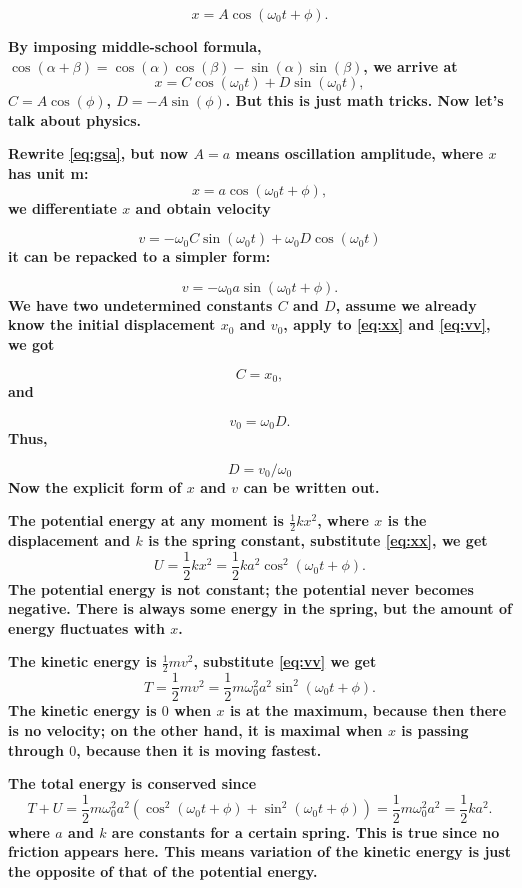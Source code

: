 \documentclass[]{revtex4}
\newcommand{\st}[1]{{\color{red}\bfseries #1}}
\begin{document}
\[x = A\cos(\omega_0t + \phi). \label{eq:gsa}\]

\st{
By imposing middle-school formula, $\cos (\alpha + \beta) = \cos(\alpha) \cos(\beta) - \sin(\alpha) \sin(\beta)$,
we arrive at
}
\[x = C\cos(\omega_0t)+ D\sin(\omega_0 t),\]
\st{
$C = A \cos(\phi)$, $D = -A \sin(\phi)$. But this is just math tricks.
Now let's talk about physics.
}

\st{
Rewrite \eqref{eq:gsa}, but now $A = a$ means oscillation amplitude, where $x$ has unit \si{\meter}:
}
\[x = a \cos(\omega_0t + \phi), \label{eq:xx}\]
\st{
we differentiate $x$ and obtain velocity
}

\[v = -\omega_0 C\sin(\omega_0t)+\omega_0 D\cos(\omega_0t)\]
\st{
it can be repacked to a simpler form:
}

\[v=-\omega_0 a \sin(\omega_0t+\phi). \label{eq:vv}\]
\st{
We have two undetermined constants $C$ and $D$, assume we already know
the initial displacement $x_0$ and $v_0$, apply to \eqref{eq:xx} and \eqref{eq:vv},
we got
}

\[C = x_0,\]
\st{
and
}

\[v_0 = \omega_0 D.\]
\st{
Thus,
}

\[D= v_0/\omega_0 \]
\st{
Now the explicit form of $x$ and $v$ can be written out.
}

\st{
The potential energy at any moment is $\frac{ 1 }{ 2 } k x^2$, where $x$ is the displacement and $k$ is the spring constant, substitute \eqref{eq:xx}, we get
}
\[U = \frac{1}{2}kx^2 = \frac{1}{2}ka^2\cos^2(\omega_0t+\phi). \label{eq:uu}\]
\st{
The potential energy is not constant; the potential never becomes negative. There is always some energy in the spring, but the amount of energy fluctuates with $x$. 
}

\st{
The kinetic energy is $\frac{ 1 }{ 2 } m v^2$, substitute \eqref{eq:vv} we get
}
\[T = \frac{1}{2}mv^2 = \frac{1}{2}m\omega_0^2a^2\sin^2(\omega_0t+\phi).\]
\st{
The kinetic energy is $0$ when $x$ is at the maximum, because then there is no velocity; on the other hand, it is maximal when $x$ is passing through $0$, because then it is moving fastest.
}

\st{
The total energy is conserved since
}
\[T+U = \frac{1}{2}m\omega_0^2a^2(\cos^2(\omega_0t+\phi)+\sin^2(\omega_0t+\phi))=\frac{1}{2}m\omega_0^2a^2 = \frac{ 1 }{ 2 } k a^2.\]
\st{
where $a$ and $k$ are constants for a certain spring. 
This is true since no friction appears here.
This means 
variation of the kinetic energy is just the opposite of that of the potential energy.
}
\end{document}
